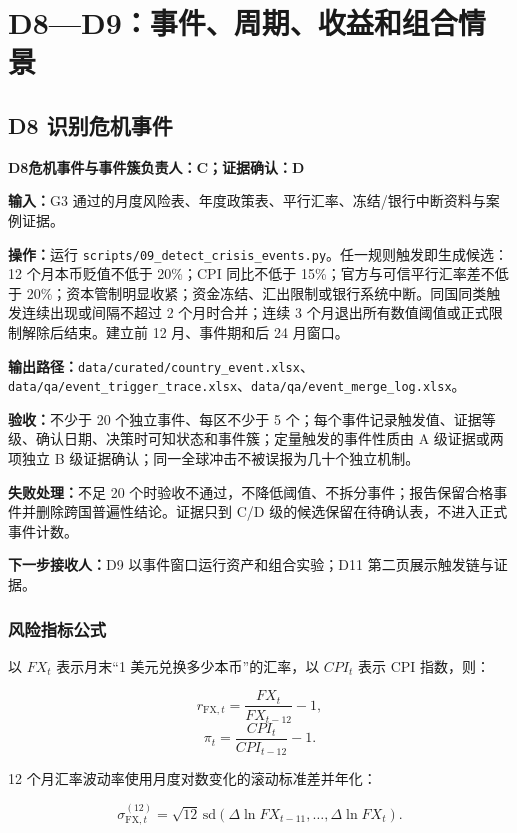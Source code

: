 \documentclass[UTF8,fontset=windows,12pt,openany]{ctexbook}
\newcommand{\File}[1]{{\small\nolinkurl{#1}}}
\newcommand{\StepTitle}[3]{%
  \noindent\colorbox{DeepNavy}{\parbox{0.965\textwidth}{\color{white}\Large\bfseries #1\quad #2\hfill\normalsize #3}}\par\medskip
}
\newcommand{\CardRow}[2]{\noindent\textbf{#1：}#2\par}
\begin{document}
\chapter{D8—D9：事件、周期、收益和组合情景}

\section{D8 识别危机事件}
\StepTitle{D8}{危机事件与事件簇}{负责人：C；证据确认：D}
\CardRow{输入}{G3 通过的月度风险表、年度政策表、平行汇率、冻结/银行中断资料与案例证据。}
\CardRow{操作}{运行 \File{scripts/09_detect_crisis_events.py}。任一规则触发即生成候选：12 个月本币贬值不低于 20\%；CPI 同比不低于 15\%；官方与可信平行汇率差不低于 20\%；资本管制明显收紧；资金冻结、汇出限制或银行系统中断。同国同类触发连续出现或间隔不超过 2 个月时合并；连续 3 个月退出所有数值阈值或正式限制解除后结束。建立前 12 月、事件期和后 24 月窗口。}
\CardRow{输出路径}{\File{data/curated/country_event.xlsx}、\File{data/qa/event_trigger_trace.xlsx}、\File{data/qa/event_merge_log.xlsx}。}
\CardRow{验收}{不少于 20 个独立事件、每区不少于 5 个；每个事件记录触发值、证据等级、确认日期、决策时可知状态和事件簇；定量触发的事件性质由 A 级证据或两项独立 B 级证据确认；同一全球冲击不被误报为几十个独立机制。}
\CardRow{失败处理}{不足 20 个时验收不通过，不降低阈值、不拆分事件；报告保留合格事件并删除跨国普遍性结论。证据只到 C/D 级的候选保留在待确认表，不进入正式事件计数。}
\CardRow{下一步接收人}{D9 以事件窗口运行资产和组合实验；D11 第二页展示触发链与证据。}

\subsection{风险指标公式}

以 \(FX_t\) 表示月末“1 美元兑换多少本币”的汇率，以 \(CPI_t\) 表示 CPI 指数，则：

\begin{equation}
r_{\mathrm{FX},t}=\frac{FX_t}{FX_{t-12}}-1,
\end{equation}
\begin{equation}
\pi_t=\frac{CPI_t}{CPI_{t-12}}-1.
\end{equation}

12 个月汇率波动率使用月度对数变化的滚动标准差并年化：

\begin{equation}
\sigma_{\mathrm{FX},t}^{(12)}=\sqrt{12}\,\mathrm{sd}\!\left(\Delta\ln FX_{t-11},\ldots,\Delta\ln FX_t\right).
\end{equation}
\end{document}
